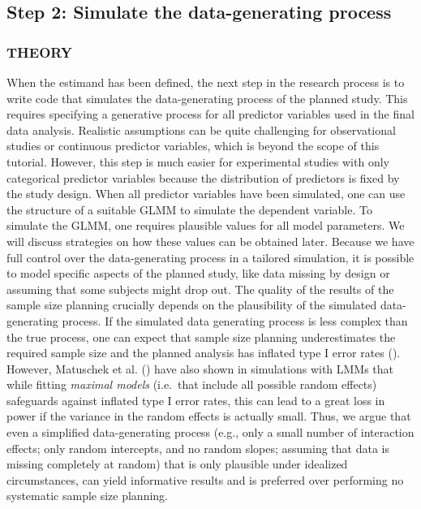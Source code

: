 \documentclass[
  man,
  floatsintext,
  longtable,
  a4paper,
  nolmodern,
  notxfonts,
  notimes,
  colorlinks=true,linkcolor=blue,citecolor=blue,urlcolor=blue]{apa7}
\begin{document}
\subsection{Step 2: Simulate the data-generating
process}\label{step-2-simulate-the-data-generating-process}

\subsubsection{THEORY}\label{theory-1}

When the estimand has been defined, the next step in the research
process is to write code that simulates the data-generating process of
the planned study. This requires specifying a generative process for all
predictor variables used in the final data analysis. Realistic
assumptions can be quite challenging for observational studies or
continuous predictor variables, which is beyond the scope of this
tutorial. However, this step is much easier for experimental studies
with only categorical predictor variables because the distribution of
predictors is fixed by the study design. When all predictor variables
have been simulated, one can use the structure of a suitable GLMM to
simulate the dependent variable. To simulate the GLMM, one requires
plausible values for all model parameters. We will discuss strategies on
how these values can be obtained later. Because we have full control
over the data-generating process in a tailored simulation, it is
possible to model specific aspects of the planned study, like data
missing by design or assuming that some subjects might drop out. The
quality of the results of the sample size planning crucially depends on
the plausibility of the simulated data-generating process. If the
simulated data generating process is less complex than the true process,
one can expect that sample size planning underestimates the required
sample size and the planned analysis has inflated type I error rates
(). However, Matuschek et al.
() have also shown
in simulations with LMMs that while fitting \emph{maximal models}
(i.e.~that include all possible random effects) safeguards against
inflated type I error rates, this can lead to a great loss in power if
the variance in the random effects is actually small. Thus, we argue
that even a simplified data-generating process (e.g., only a small
number of interaction effects; only random intercepts, and no random
slopes; assuming that data is missing completely at random) that is only
plausible under idealized circumstances, can yield informative results
and is preferred over performing no systematic sample size planning.
\end{document}
